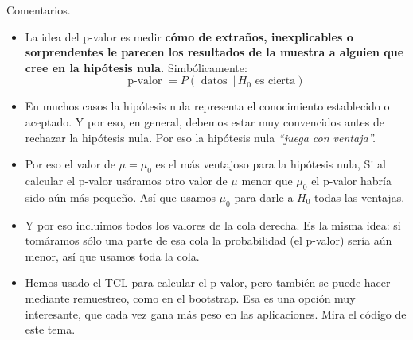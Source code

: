 \documentclass[
  9pt,
  ignorenonframetext,
]{beamer}
\begin{document}
\begin{frame}{Comentarios.}
\protect\hypertarget{comentarios.}{}

\begin{itemize}
\item
  La idea del p-valor es medir \textbf{cómo de extraños, inexplicables o
  sorprendentes le parecen los resultados de la muestra a alguien que
  cree en la hipótesis nula.} Simbólicamente:
  \[\text{p-valor } = P(\text{ datos }\,|\, H_0\text{ es cierta})\]
\item
  En muchos casos la hipótesis nula representa el conocimiento
  establecido o aceptado. Y por eso, en general, debemos estar muy
  convencidos antes de rechazar la hipótesis nula. Por eso la hipótesis
  nula \emph{``juega con ventaja''.}
\item
  Por eso el valor de \(\mu = \mu_0\) es el más ventajoso para la
  hipótesis nula, Si al calcular el p-valor usáramos otro valor de
  \(\mu\) menor que \(\mu_0\) el p-valor habría sido aún más pequeño.
  Así que usamos \(\mu_0\) para darle a \(H_0\) todas las ventajas.
\item
  Y por eso incluimos todos los valores de la cola derecha. Es la misma
  idea: si tomáramos sólo una parte de esa cola la probabilidad (el
  p-valor) sería aún menor, así que usamos toda la cola.
\item
  Hemos usado el TCL para calcular el p-valor, pero también se puede
  hacer mediante remuestreo, como en el bootstrap. Esa es una opción muy
  interesante, que cada vez gana más peso en las aplicaciones. Mira el
  código de este tema.
\end{itemize}

\end{frame}
\end{document}

